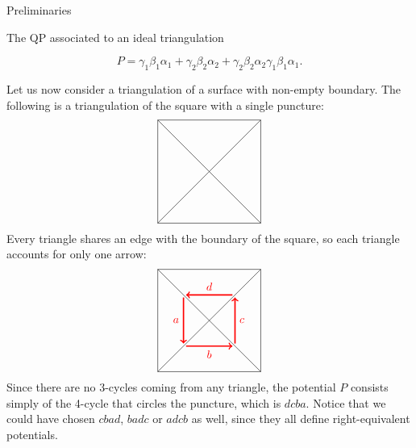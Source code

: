 \begin{chapter}{Preliminaries}
\begin{section}{The QP associated to an ideal triangulation}
\begin{exmp}
\[P = \gamma_1\beta_1\alpha_1+\gamma_2\beta_2\alpha_2+\gamma_2\beta_2\alpha_2\gamma_1\beta_1\alpha_1.\]
\end{exmp}
\begin{exmp} Let us now consider a triangulation of a surface with non-empty boundary. The following is a triangulation of the square with a single puncture:
\[
\begin{tikzpicture}[scale=0.8]
\draw (-2,-2) to (-2,2);
\draw (-2,2) to (2,2);
\draw (2,2) to (2,-2);
\draw (2,-2) to (-2,-2);
\draw (-2,-2) to (2,2);
\draw (-2,2) to (2,-2);
\end{tikzpicture}
\]
Every triangle shares an edge with the boundary of the square, so each triangle accounts for only one arrow:
\[
\begin{tikzpicture}[scale=0.8]
\draw (-2,-2) to (-2,2);
\draw (-2,2) to (2,2);
\draw (2,2) to (2,-2);
\draw (2,-2) to (-2,-2);
\draw (-2,-2) to (2,2);
\draw (-2,2) to (2,-2);
\draw[->, red, very thick] (-1,0.9) to node[left] {$a$} (-1, -0.9);
\draw[->, red, very thick] (-0.9,-1) to node[below] {$b$} (0.9, -1);
\draw[->, red, very thick] (1,-0.9) to node[right] {$c$} (1, 0.9);
\draw[->, red, very thick] (0.9, 1) to node[above] {$d$} (-0.9, 1);
\end{tikzpicture}
\]
Since there are no 3-cycles coming from any triangle, the potential $P$ consists simply of the 4-cycle that circles the puncture, which is $dcba$. Notice that we could have chosen $cbad$, $badc$ or $adcb$ as well, since they all define right-equivalent potentials.
\end{exmp}
\end{section}
\end{chapter}